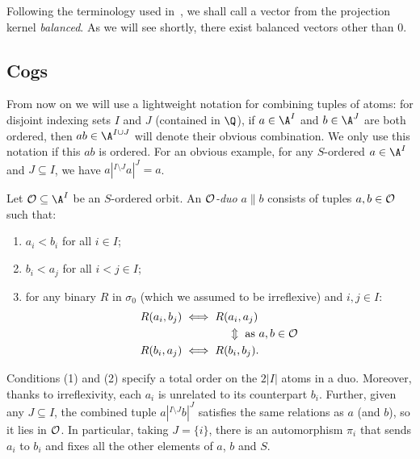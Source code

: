 Following the terminology used in~\cite[Eq.~(4)]{BFKM24}, we shall call a vector from the projection kernel \emph{balanced}.
As we will see shortly, there exist balanced vectors other than $0$.

\subsection{Cogs}
From now on we will use a lightweight notation for combining tuples of atoms: 
for disjoint indexing sets $I$ and $J$ (contained in $\Q$), 
if $a\in\A^I$ and $b\in\A^{J}$ are both ordered, 
then $ab\in \A^{I\cup J}$ will denote their obvious combination. 
We only use this notation if this $ab$ is ordered. 
For an obvious example, for any $S$-ordered $a\in\A^I$ and $J\subseteq I$, we have $a|^{I\setminus J}a|^J=a$.

\begin{definition}\label{def:duo}
    Let $\cal O \subseteq \A^I$ be an $S$-ordered orbit. 
    An \emph{$\cal O$-duo} $a \parallel b$ consists of tuples $a, b \in \cal O$ such that:
    \begin{enumerate}
        \item 
        $a_i < b_i$ for all $i\in I$;
        
        \item 
        $b_i < a_j$ for all $i<j\in I$;

        \item 
        for any binary $R$ in $\sigma_0$ (which we assumed to be irreflexive) and $i,j\in I$:
        \begin{align*}
            R(a_i,b_j) \iff R(&a_i,a_j) \\
            &\Updownarrow \text{ as $a, b \in \cal O$} \\
            R(b_i,a_j) \iff R(&b_i,b_j).
        \end{align*}
     \end{enumerate}
\end{definition}
\begin{remark}\label{rem:duo}
Conditions (1) and (2) specify a total order on the $2|I|$ atoms in a duo.
Moreover, thanks to irreflexivity, 
each $a_i$ is unrelated to its counterpart $b_i$.
Further, given any $J \subseteq I$, the combined tuple $a|^{I\setminus J} b|^J$ satisfies the same relations as $a$ (and $b$), so it lies in $\cal O$. In particular, taking $J=\{i\}$, there is an automorphism $\pi_i$ that sends $a_i$ to $b_i$ and fixes all the other elements of $a$, $b$ and $S$.
\end{remark}

